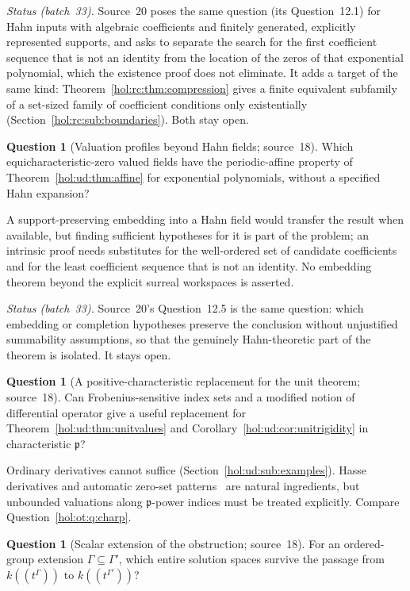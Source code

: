 \documentclass[11pt]{article}
\numberwithin{equation}{section}
\theoremstyle{definition}
\newtheorem{question}[theorem]{Question}
\theoremstyle{remark}
\begin{document}
\emph{Status (batch~33).} Source~20 poses the same question (its
Question~12.1) for Hahn inputs with algebraic coefficients and finitely
generated, explicitly represented supports, and asks to separate the search
for the first coefficient sequence that is not an identity from the location
of the zeros of that exponential polynomial, which the existence proof does not
eliminate. It adds a target of the same kind:
Theorem~\ref{hol:rc:thm:compression} gives a finite equivalent subfamily of a
set-sized family of coefficient conditions only existentially
(Section~\ref{hol:rc:sub:boundaries}). Both stay open.

\begin{question}[Valuation profiles beyond Hahn fields; source~18]
\label{hol:ud:q:beyond}
Which equicharacteristic-zero valued fields have the periodic-affine property
of Theorem~\ref{hol:ud:thm:affine} for exponential polynomials, without a
specified Hahn expansion?
\end{question}

A support-preserving embedding into a Hahn field would transfer the result
when available, but finding sufficient hypotheses for it is part of the
problem; an intrinsic proof needs substitutes for the well-ordered set of
candidate coefficients and for the least coefficient sequence that is not an
identity. No embedding theorem beyond the explicit surreal workspaces is
asserted.

\emph{Status (batch~33).} Source~20's Question~12.5 is the same question: which
embedding or completion hypotheses preserve the conclusion without unjustified
summability assumptions, so that the genuinely Hahn-theoretic part of the
theorem is isolated. It stays open.

\begin{question}[A positive-characteristic replacement for the unit theorem;
source~18]\label{hol:ud:q:charp}
Can Frobenius-sensitive index sets and a modified notion of differential
operator give a useful replacement for Theorem~\ref{hol:ud:thm:unitvalues} and
Corollary~\ref{hol:ud:cor:unitrigidity} in characteristic $\mathfrak p$?
\end{question}

Ordinary derivatives cannot suffice (Section~\ref{hol:ud:sub:examples}).
Hasse derivatives and automatic zero-set patterns~\cite{derksen} are natural
ingredients, but unbounded valuations along $\mathfrak p$-power indices must be
treated explicitly. Compare Question~\ref{hol:ot:q:charp}.

\begin{question}[Scalar extension of the obstruction; source~18]
\label{hol:ud:q:extension}
For an ordered-group extension $\Gamma\subseteq\Gamma'$, which entire solution
spaces survive the passage from $k((t^\Gamma))$ to $k((t^{\Gamma'}))$?
\end{question}
\end{document}
